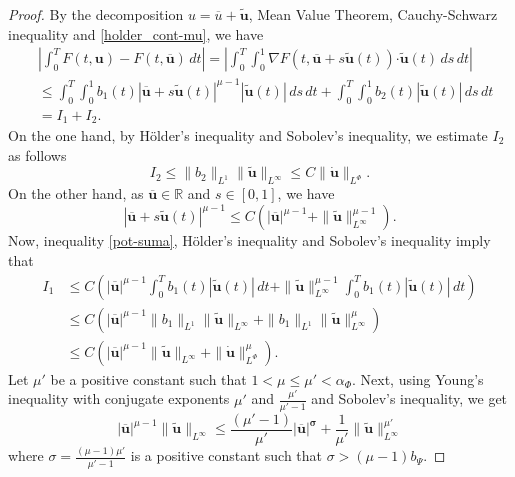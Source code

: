 \documentclass[twoside]{article}
\theoremstyle{remark}
\newcommand{\orlnor}{\|_{L^{\Phi}}}
\renewcommand{\b}[1]{\boldsymbol{#1}}
\newcommand{\rr}{\mathbb{R}}
\newcommand{\ccdot}{\b{\cdot}}
\renewcommand{\leq}{\leqslant}
\begin{document}
\begin{proof} 
By the decomposition $u=\overline{u}+\b{\tilde{u}}$,  Mean Value Theorem, Cauchy-Schwarz inequality 
and \eqref{holder_cont-mu}, we have
\begin{equation}\label{cota-diferencia-F}
\begin{split}
&\left|\int_0^T F(t,\b{u})-F(t,\b{\overline{u}})\,dt\right|=
\left|\int_0^T \int_0^1 \nabla F(t,\b{\overline{u}}+s\b{\tilde{u}}(t))\ccdot \b{\tilde{u}}(t) \,ds \,dt\right|
\\
&\leq \int_0^T \int_0^1 b_1(t)|\b{\overline{u}}+s\b{\tilde{u}}(t)|^{\mu-1}|\b{\tilde{u}}(t)|\,ds\,dt+
\int_0^T \int_0^1 b_2(t)|\b{\tilde{u}}(t)|\,ds\,dt
\\
&=I_1+I_2.
\end{split}
\end{equation}
On the one hand, by H\"older's inequality and Sobolev's inequality, we estimate $I_2$ as follows
\begin{equation}\label{cota-i2}
I_2\leq \|b_2\|_{L^1} \|\b{\tilde{u}}\|_{L^{\infty}}\leq
C\|\b{\dot u}\orlnor.
\end{equation}
On the other hand, as $\b{\overline{u}}\in\rr$ and $s\in [0,1]$, we have
\begin{equation}\label{pot-suma}
|\b{\overline{u}}+s\b{\tilde{u}}(t)|^{\mu-1}\leq
C(|\b{\overline{u}}|^{\mu-1}+\|\b{\tilde{u}}\|_{L^{\infty}}^{\mu-1}).
\end{equation}
Now,  inequality \eqref{pot-suma}, H\"older's inequality and Sobolev's inequality imply that
\begin{equation}\label{cota-i1}
\begin{split}
I_1&\leq 
C\left(|\b{\overline{u}}|^{\mu-1} \int_0^T b_1(t) |\b{\tilde{u}}(t)|\,dt+
\|\b{\tilde{u}}\|^{\mu-1}_{L^{\infty}} \int_0^T b_1(t)|\b{\tilde{u}}(t)| \,dt\right)
\\
&\leq C\left( |\b{\overline{u}}|^{\mu-1} \|b_1\|_{L^1} \|\b{\tilde{u}}\|_{L^{\infty}}+
 \|b_1\|_{L^1}\|\b{\tilde{u}}\|^{\mu}_{L^\infty}\right) 
\\
&\leq C\left( |\b{\overline{u}}|^{\mu-1} \|\b{\tilde{u}}\|_{L^{\infty}}+ \|\b{\dot u}\orlnor^{\mu}\right).
\end{split}
\end{equation}
Let $\mu'$ be a positive constant such that $1<\mu\leq \mu'<\alpha_{\Phi}$. 
Next, using Young's inequality with conjugate exponents $\mu'$ and $\frac{\mu'}{\mu'-1}$ 
and Sobolev's inequality, we get
\begin{equation}\label{cota-i1-parcial}
|\b{\overline{u}}|^{\mu-1}  \|\b{\tilde{u}}\|_{L^{\infty}}
\leq \frac{(\mu'-1)}{\mu'}|\b{\overline{u}|^{\sigma}}
+\frac{1}{\mu'}\|\b{\tilde{u}}\|_{L^{\infty}}^{\mu'}
\end{equation}
where $\sigma=\frac{(\mu-1) \mu'}{\mu'-1}$ is a positive constant such that $\sigma>(\mu-1)b_{\Psi}$.


\end{proof}
\end{document}
